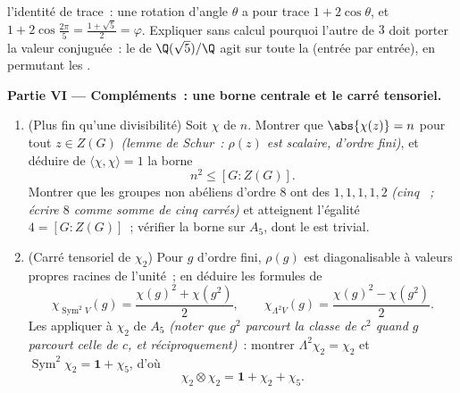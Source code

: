 \begin{problem}
\begin{enumerate}[resume]
        l'identité de trace~: une rotation d'angle $\theta$ a
        pour trace $1 + 2\cos\theta$, et $1 +
        2\cos\frac{2\pi}5 = \frac{1+\sqrt5}2 = \varphi$.
        Expliquer sans calcul pourquoi l'autre  de
         $3$ doit porter la valeur conjuguée~: le  de $\Q(\sqrt5)/\Q$ agit sur toute la  (entrée par entrée), en permutant les
         .
\end{enumerate}

\medskip
\noindent\textbf{Partie VI --- Compléments~: une borne centrale
et le carré tensoriel.}
\begin{enumerate}[resume]
  \item (Plus fin qu'une divisibilité) Soit $\chi$ 
        de  $n$. Montrer que $\abs{\chi(z)} = n$ pour tout
        $z \in Z(G)$ \emph{(lemme de Schur~: $\rho(z)$ est
        scalaire, d'ordre fini)}, et déduire de $\langle\chi,
        \chi\rangle = 1$ la borne
        \[
        n^2 \leq [G : Z(G)] .
        \]
        Montrer que les groupes non abéliens d'ordre $8$ ont
        des   $1, 1, 1, 1, 2$ \emph{(cinq
        ~; écrire $8$ comme somme de
        cinq carrés)} et atteignent l'égalité $4 = [G :
        Z(G)]$~; vérifier la borne sur $A_5$, dont le 
        est trivial.
  \item (Carré tensoriel de $\chi_2$) Pour $g$ d'ordre fini,
        $\rho(g)$ est diagonalisable à valeurs propres racines
        de l'unité~; en déduire les formules de 
        \[
        \chi_{\operatorname{Sym}^2 V}(g)
        = \frac{\chi(g)^2 + \chi(g^2)}2,
        \qquad
        \chi_{\Lambda^2 V}(g)
        = \frac{\chi(g)^2 - \chi(g^2)}2 .
        \]
        Les appliquer à $\chi_2$ de $A_5$ \emph{(noter que $g^2$
        parcourt la classe de $c^2$ quand $g$ parcourt celle de
        $c$, et réciproquement)}~: montrer $\Lambda^2\chi_2 =
        \chi_2$ et $\operatorname{Sym}^2\chi_2 = \mathbf 1 +
        \chi_5$, d'où
        \[
        \chi_2\otimes\chi_2 = \mathbf 1 + \chi_2 + \chi_5 .
\]
\end{enumerate}
\end{problem}
